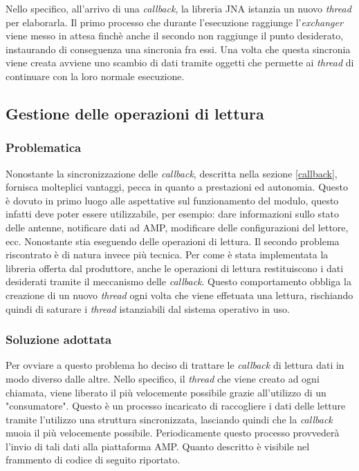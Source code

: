 Nello specifico, all'arrivo di una \emph{callback}, la libreria JNA istanzia un nuovo \emph{thread} per elaborarla. 
Il primo processo che durante l'esecuzione raggiunge l'\emph{exchanger} viene messo in attesa finchè anche il secondo non
raggiunge il punto desiderato, instaurando di conseguenza una sincronia fra essi. Una volta che questa sincronia viene
creata avviene uno scambio di dati tramite oggetti che permette ai \emph{thread} di continuare con la loro normale
esecuzione.

\subsection{Gestione delle operazioni di lettura}
\subsubsection*{Problematica}
Nonostante la sincronizzazione delle \emph{callback}, descritta nella sezione \ref{callback}, fornisca molteplici
vantaggi, pecca in quanto a prestazioni ed autonomia. Questo è dovuto in primo luogo alle aspettative sul funzionamento
del modulo, questo infatti deve poter essere utilizzabile, per esempio: dare informazioni sullo stato delle antenne, notificare
dati ad AMP, modificare delle configurazioni del lettore, ecc. Nonostante stia eseguendo delle operazioni di lettura.
Il secondo problema riscontrato è di natura invece più tecnica. Per come è stata implementata la libreria offerta dal produttore,
anche le operazioni di lettura restituiscono i dati desiderati tramite il meccanismo delle \emph{callback}. 
Questo comportamento obbliga la creazione di un nuovo \emph{thread} ogni volta che viene effetuata una lettura, rischiando quindi di saturare 
i \emph{thread} istanziabili dal sistema operativo in uso.

\subsubsection*{Soluzione adottata}
Per ovviare a questo problema ho deciso di trattare le \emph{callback} di lettura dati in modo diverso dalle altre. 
Nello specifico, il \emph{thread} che viene creato ad ogni chiamata, viene liberato il più velocemente possibile grazie all'utilizzo di un
"consumatore". Questo è un processo incaricato di raccogliere i dati delle letture tramite l'utilizzo una struttura sincronizzata, 
lasciando quindi che la \emph{callback} muoia il più velocemente possibile. Periodicamente questo processo provvederà l'invio di tali dati alla piattaforma AMP. 
Quanto descritto è visibile nel frammento di codice di seguito riportato.

